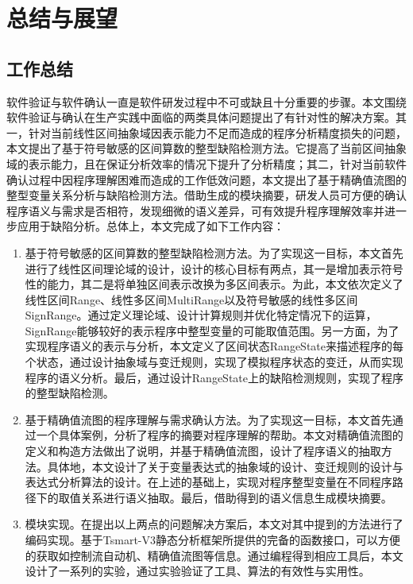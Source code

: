 
\chapter{总结与展望}

\section{工作总结}

软件验证与软件确认一直是软件研发过程中不可或缺且十分重要的步骤。本文围绕软件验证与确认在生产实践中面临的两类具体问题提出了有针对性的解决方案。其一，针对当前线性区间抽象域因表示能力不足而造成的程序分析精度损失的问题，本文提出了基于符号敏感的区间算数的整型缺陷检测方法。它提高了当前区间抽象域的表示能力，且在保证分析效率的情况下提升了分析精度；其二，针对当前软件确认过程中因程序理解困难而造成的工作低效问题，本文提出了基于精确值流图的整型变量关系分析与缺陷检测方法。借助生成的模块摘要，研发人员可方便的确认程序语义与需求是否相符，发现细微的语义差异，可有效提升程序理解效率并进一步应用于缺陷分析。总体上，本文完成了如下工作内容：

\begin{enumerate}
	\item 基于符号敏感的区间算数的整型缺陷检测方法。为了实现这一目标，本文首先进行了线性区间理论域的设计，设计的核心目标有两点，其一是增加表示符号性的能力，其二是将单独区间表示改换为多区间表示。为此，本文依次定义了线性区间Range、线性多区间MultiRange以及符号敏感的线性多区间SignRange。通过定义理论域、设计计算规则并优化特定情况下的运算，SignRange能够较好的表示程序中整型变量的可能取值范围。另一方面，为了实现程序语义的表示与分析，本文定义了区间状态RangeState来描述程序的每个状态，通过设计抽象域与变迁规则，实现了模拟程序状态的变迁，从而实现程序的语义分析。最后，通过设计RangeState上的缺陷检测规则，实现了程序的整型缺陷检测。
	
	\item 基于精确值流图的程序理解与需求确认方法。为了实现这一目标，本文首先通过一个具体案例，分析了程序的摘要对程序理解的帮助。本文对精确值流图的定义和构造方法做出了说明，并基于精确值流图，设计了程序语义的抽取方法。具体地，本文设计了关于变量表达式的抽象域的设计、变迁规则的设计与表达式分析算法的设计。在上述的基础上，实现对程序整型变量在不同程序路径下的取值关系进行语义抽取。最后，借助得到的语义信息生成模块摘要。
	
	\item 模块实现。在提出以上两点的问题解决方案后，本文对其中提到的方法进行了编码实现。基于Tsmart-V3静态分析框架所提供的完备的函数接口，可以方便的获取如控制流自动机、精确值流图等信息。通过编程得到相应工具后，本文设计了一系列的实验，通过实验验证了工具、算法的有效性与实用性。
\end{enumerate}

